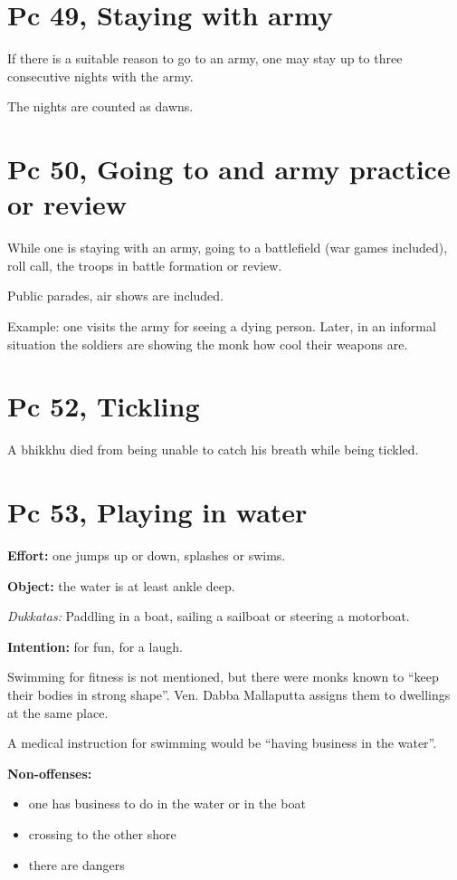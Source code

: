 \section{Pc 49, Staying with army}

If there is a suitable reason to go to an army, one may stay up to three
consecutive nights with the army.

The nights are counted as dawns.

\section{Pc 50, Going to and army practice or review}

While one is staying with an army, going to a battlefield (war games
included), roll call, the troops in battle formation or review.

Public parades, air shows are included.

Example: one visits the army for seeing a dying person. Later, in an
informal situation the soldiers are showing the monk how cool their
weapons are.

\section{Pc 52, Tickling}

A bhikkhu died from being unable to catch his breath while being
tickled.

\clearpage

\section{Pc 53, Playing in water}

\begin{multicols}{2}

\textbf{Effort:} one jumps up or down, splashes or swims.

\textbf{Object:} the water is at least ankle deep.

\emph{Dukkatas:} Paddling in a boat, sailing a sailboat or steering a
motorboat.

\textbf{Intention:} for fun, for a laugh.

Swimming for fitness is not mentioned, but there were monks known to
``keep their bodies in strong shape''. Ven. Dabba Mallaputta assigns
them to dwellings at the same place.

A medical instruction for swimming would be ``having business in the
water''.

\textbf{Non-offenses:}

\begin{itemize}
\tightlist
\item
  one has business to do in the water or in the boat
\item
  crossing to the other shore
\item
  there are dangers
\end{itemize}

\end{multicols}

